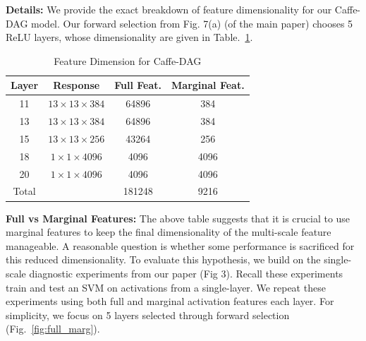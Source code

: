 \documentclass[10pt,twocolumn,letterpaper]{article}
\begin{document}
{\bf Details:} We provide the exact breakdown of feature dimensionality for our Caffe-DAG model. Our forward selection from  Fig. 7(a) (of the main paper) chooses 5 ReLU layers, whose dimensionality are given in Table.~\ref{table:feat_dim}.

\begin{table}[htbp]
\begin{center}
\begin{tabular}{|c|c|c|c|}
\hline
Layer & Response &  Full Feat.& Marginal Feat.\\
\hline
11 & $13\times 13 \times 384$ & 64896 & 384 \\
13 & $13\times 13 \times 384$ & 64896 & 384 \\
15 & $13\times 13 \times 256$ & 43264 & 256 \\
18 & $1\times 1 \times 4096$ & 4096 & 4096 \\
20 & $1\times 1 \times 4096$ & 4096 & 4096 \\
\hline
Total& & 181248 & 9216\\
\hline
\end{tabular}
\end{center}
\caption{Feature Dimension for Caffe-DAG}
\label{table:feat_dim}
\end{table}



{\bf Full vs Marginal Features:} The above table suggests that it is crucial to use marginal features to keep the final dimensionality of the multi-scale feature manageable. A reasonable question is whether some performance is sacrificed for this reduced dimensionality. To evaluate this hypothesis, we build on the single-scale diagnostic experiments from our paper (Fig 3). Recall these experiments train and test an SVM on activations from a single-layer. We repeat these experiments using both full and marginal activation features each layer. For simplicity, we focus on 5 layers selected through forward selection (Fig.~\ref{fig:full_marg}).

\end{document}
